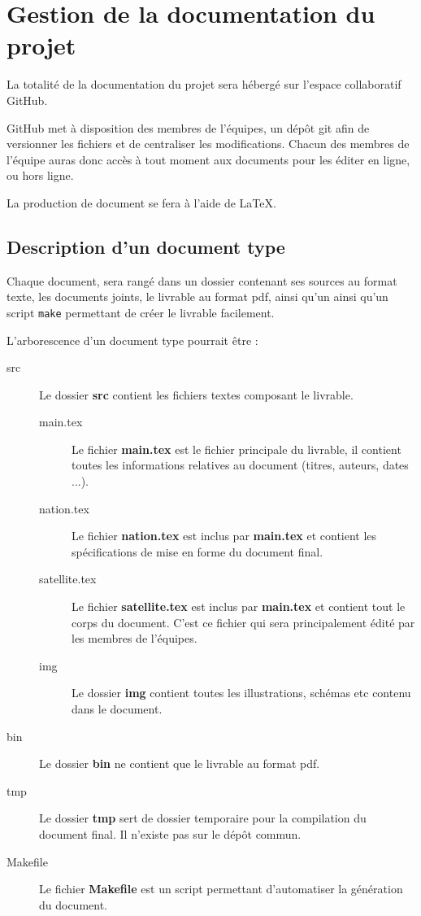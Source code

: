 \section{Gestion de la documentation du projet}

La totalité de la documentation du projet sera hébergé sur l'espace collaboratif GitHub.

GitHub met à disposition des membres de l'équipes, un dépôt git afin de versionner les fichiers et de centraliser les modifications.
Chacun des membres de l’équipe auras donc accès à tout moment aux documents pour les éditer en ligne, ou hors ligne.

La production de document se fera à l’aide de LaTeX.

\subsection{Description d'un document type}

Chaque document, sera rangé dans un dossier contenant ses sources au format texte, les documents joints, le livrable au format pdf, ainsi qu'un  ainsi qu'un script \texttt{make} permettant de créer le livrable facilement.

L'arborescence d'un document type pourrait être :
\begin{description}
    \item[src]{Le dossier {\bf src} contient les fichiers textes composant le livrable.}
    \begin{description}
        \item[main.tex]{Le fichier {\bf main.tex} est le fichier principale du livrable, il contient toutes les informations relatives au document (titres, auteurs, dates ...).}
        \item[nation.tex] {Le fichier {\bf nation.tex} est inclus par {\bf main.tex} et contient les spécifications de mise en forme du document final.}
        \item[satellite.tex] {Le fichier {\bf satellite.tex} est inclus par {\bf main.tex} et contient tout le corps du document. C'est ce fichier qui sera principalement édité par les membres de l'équipes.}
        \item[img] {Le dossier {\bf img} contient toutes les illustrations, schémas etc contenu dans le document.}
    \end{description}
    \item [bin]{Le dossier {\bf bin} ne contient que le livrable au format pdf.}
    \item [tmp]{Le dossier {\bf tmp} sert de dossier temporaire pour la compilation du document final. Il n'existe pas sur le dépôt commun.}
    \item [Makefile]{Le fichier {\bf Makefile} est un script permettant d'automatiser la génération du document.}
\end{description}

